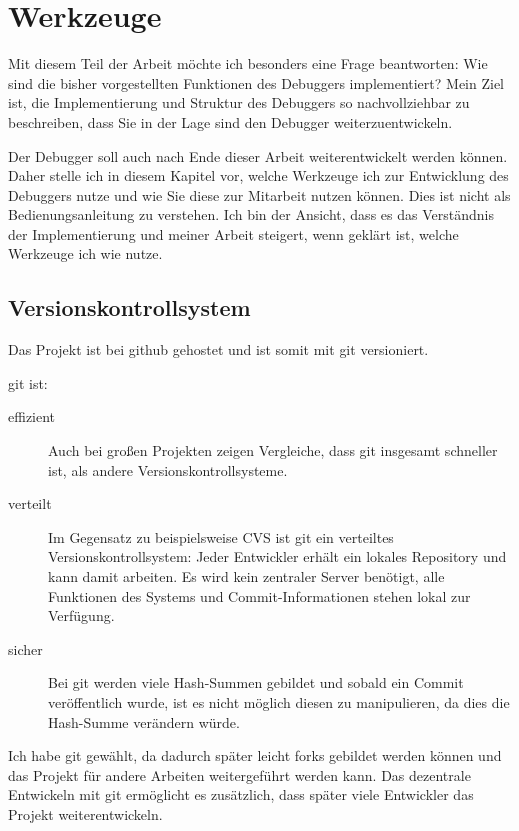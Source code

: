 \chapter{Werkzeuge}
Mit diesem Teil der Arbeit möchte ich besonders eine Frage beantworten: Wie sind die bisher vorgestellten Funktionen des Debuggers implementiert? Mein Ziel ist, die Implementierung und Struktur des Debuggers so nachvollziehbar zu beschreiben, dass Sie in der Lage sind den Debugger weiterzuentwickeln.

Der Debugger soll auch nach Ende dieser Arbeit weiterentwickelt werden können. Daher stelle ich in diesem Kapitel vor, welche Werkzeuge ich zur Entwicklung des Debuggers nutze und wie Sie diese zur Mitarbeit nutzen können. Dies ist nicht als Bedienungsanleitung zu verstehen. Ich bin der Ansicht, dass es das Verständnis der Implementierung und meiner Arbeit steigert, wenn geklärt ist, welche Werkzeuge ich wie nutze.

\section{Versionskontrollsystem}
Das Projekt ist bei github %
gehostet und ist somit mit \gls{git} versioniert.

\gls{git} %
ist:
\begin{description}
\item[effizient] Auch bei großen Projekten zeigen Vergleiche, %
dass \gls{git} insgesamt schneller ist, als andere Versionskontrollsysteme.
\item[verteilt] Im Gegensatz zu beispielsweise CVS %
ist \gls{git} ein verteiltes Versionskontrollsystem: Jeder Entwickler erhält ein lokales Repository %
und kann damit arbeiten. Es wird kein zentraler Server benötigt, alle Funktionen des Systems und Commit-Informationen stehen lokal zur Verfügung.
\item[sicher] %
Bei \gls{git} werden viele Hash-Summen gebildet und sobald ein Commit veröffentlich wurde, ist es nicht möglich diesen zu manipulieren, da dies die Hash-Summe %
verändern würde.
\end{description}

Ich habe \gls{git} gewählt, da dadurch später leicht forks %
gebildet werden können und das Projekt für andere Arbeiten weitergeführt werden kann. Das dezentrale Entwickeln mit \gls{git} ermöglicht es zusätzlich, dass später viele Entwickler das Projekt weiterentwickeln.


